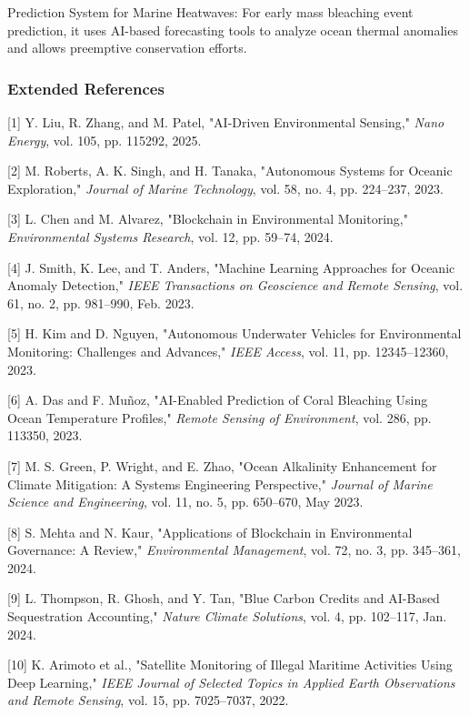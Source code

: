 \documentclass[a4paper]{article}
\begin{document}
\begin{enumerate}
 
\end{enumerate}

Prediction System for Marine Heatwaves: For early mass bleaching event prediction, it uses AI-based forecasting tools to analyze ocean thermal anomalies and allows preemptive conservation efforts.


\subsubsection{Extended References}

[1] Y. Liu, R. Zhang, and M. Patel, "AI-Driven Environmental Sensing," \textit{Nano Energy}, vol. 105, pp. 115292, 2025.

[2] M. Roberts, A. K. Singh, and H. Tanaka, "Autonomous Systems for Oceanic Exploration," \textit{Journal of Marine Technology}, vol. 58, no. 4, pp. 224–237, 2023.

[3] L. Chen and M. Alvarez, "Blockchain in Environmental Monitoring," \textit{Environmental Systems Research}, vol. 12, pp. 59–74, 2024.
 
[4] J. Smith, K. Lee, and T. Anders, "Machine Learning Approaches for Oceanic Anomaly Detection," \textit{IEEE Transactions on Geoscience and Remote Sensing}, vol. 61, no. 2, pp. 981–990, Feb. 2023.

[5] H. Kim and D. Nguyen, "Autonomous Underwater Vehicles for Environmental Monitoring: Challenges and Advances," \textit{IEEE Access}, vol. 11, pp. 12345–12360, 2023.

[6] A. Das and F. Muñoz, "AI-Enabled Prediction of Coral Bleaching Using Ocean Temperature Profiles," \textit{Remote Sensing of Environment}, vol. 286, pp. 113350, 2023.

[7] M. S. Green, P. Wright, and E. Zhao, "Ocean Alkalinity Enhancement for Climate Mitigation: A Systems Engineering Perspective," \textit{Journal of Marine Science and Engineering}, vol. 11, no. 5, pp. 650–670, May 2023.

[8] S. Mehta and N. Kaur, "Applications of Blockchain in Environmental Governance: A Review," \textit{Environmental Management}, vol. 72, no. 3, pp. 345–361, 2024.

[9] L. Thompson, R. Ghosh, and Y. Tan, "Blue Carbon Credits and AI-Based Sequestration Accounting," \textit{Nature Climate Solutions}, vol. 4, pp. 102–117, Jan. 2024.

[10] K. Arimoto et al., "Satellite Monitoring of Illegal Maritime Activities Using Deep Learning," \textit{IEEE Journal of Selected Topics in Applied Earth Observations and Remote Sensing}, vol. 15, pp. 7025–7037, 2022.




\end{document}
